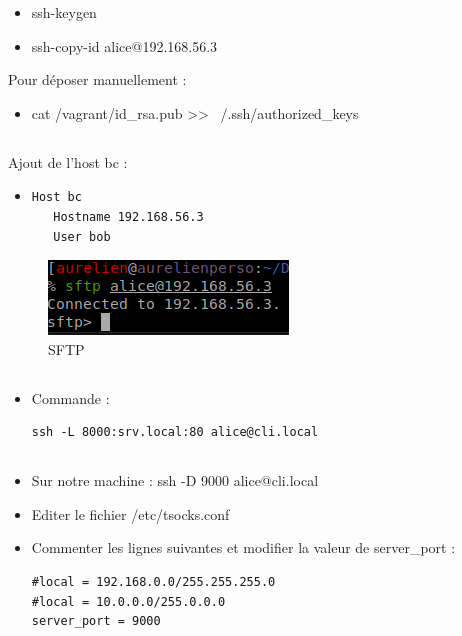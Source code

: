 \documentclass{article}
\begin{document}
\begin{itemize}
    \item ssh-keygen
    \item ssh-copy-id alice@192.168.56.3
\end{itemize}
Pour déposer manuellement : 
\begin{itemize}
    \item cat /vagrant/id\_rsa.pub >> ~/.ssh/authorized\_keys 
\end{itemize}

\subsection{}

Ajout de l'host bc :
\begin{itemize}
\item
\begin{lstlisting}
Host bc
   Hostname 192.168.56.3
   User bob
\end{lstlisting}
\end{itemize}


\begin{figure}[h]
\centering
\includegraphics[width=0.7\columnwidth]{screen/ssh3.png}
\caption{\label{fig:frog}SFTP}
\end{figure}

\subsection{}
\begin{itemize}
    \item Commande : 
\begin{lstlisting}
ssh -L 8000:srv.local:80 alice@cli.local 
\end{lstlisting}
\end{itemize}

\subsection{}
\begin{itemize}
    \item Sur notre machine : ssh -D 9000 alice@cli.local
    \item Editer le fichier /etc/tsocks.conf
    \item Commenter les lignes suivantes et modifier la valeur de server\_port :
\begin{lstlisting}
#local = 192.168.0.0/255.255.255.0
#local = 10.0.0.0/255.0.0.0
server_port = 9000

\end{lstlisting}
\end{itemize}
\end{document}
